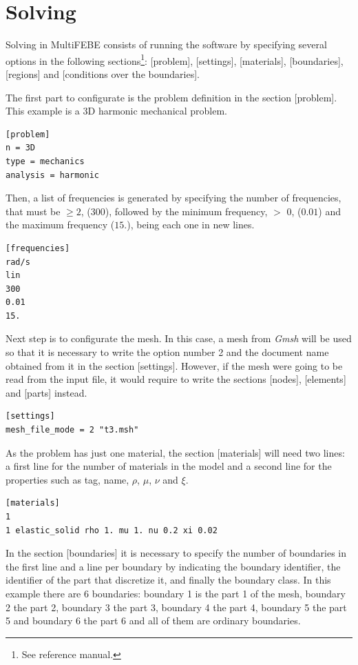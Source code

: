 \documentclass[a4]{article}
\begin{document}
\section{Solving}
Solving in MultiFEBE consists of running the software by specifying several options in the following sections\footnote{See reference manual.}: [problem], [settings], [materials], [boundaries], [regions] and [conditions over the boundaries].

The first part to configurate is the problem definition in the section [problem]. This example is a 3D harmonic mechanical problem.  

\begin{Verbatim}	
[problem]
n = 3D
type = mechanics
analysis = harmonic
\end{Verbatim}

Then, a list of frequencies is generated by specifying the number of frequencies, that must be $\geq 2$, (300), followed by the minimum frequency, $>$ 0, ($0.01$) and the maximum frequency ($15.$), being each one in new lines.

\begin{Verbatim}
[frequencies]
rad/s
lin
300
0.01
15.
\end{Verbatim}

Next step is to configurate the mesh. In this case, a mesh from \textit{Gmsh} will be used so that it is necessary to write the option number 2 and the document name obtained from it in the section [settings]. However, if the mesh were going to be read from the input file, it would require to write the sections [nodes], [elements] and [parts] instead.

\begin{Verbatim}	
[settings]
mesh_file_mode = 2 "t3.msh"
\end{Verbatim}

As the problem has just one material, the section [materials] will need two lines: a first line for the number of materials in the model and a second line for the properties such as tag, name, $\rho$, $\mu$, $\nu$ and $\xi$.

\begin{Verbatim}	
[materials]
1
1 elastic_solid rho 1. mu 1. nu 0.2 xi 0.02
\end{Verbatim}

In the section [boundaries] it is necessary to specify the number of boundaries in the first line and a line per boundary by indicating the boundary identifier,
the identifier of the part that discretize it, and finally the boundary class. In this example there are 6 boundaries: boundary 1 is the part 1 of the mesh, boundary 2 the part 2, boundary 3 the part 3, boundary 4 the part 4, boundary 5 the part 5 and boundary 6 the part 6 and all of them are ordinary boundaries.
\end{document}

